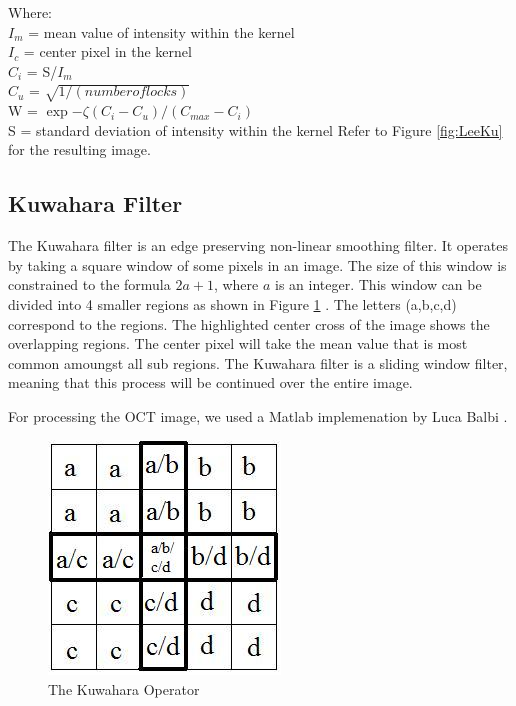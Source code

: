 \documentclass{article}
\begin{document}
Where:
\\
	$I_{m}$ = mean value of intensity within the kernel
	\\
	$I_{c}$ = center pixel in the kernel
	\\
	$C_{i}$ = S/$I_{m}$
	\\
	$C_{u}$ = $\sqrt{1/(number of locks)}$
	\\
	W				= $\exp{-\zeta(C_{i}-C_{u})/(C_{max}-C_{i})}$
	\\
	S       = standard deviation of intensity within the kernel
	\cite{radarlee}
  Refer to Figure \ref{fig:LeeKu} for the resulting image.
\subsection{\label{sec:level2} Kuwahara Filter}

The Kuwahara filter is an edge preserving non-linear smoothing filter. It operates by taking a square window of some pixels in an image. The size of this window is constrained to the formula $2a + 1$, where $a$ is an integer. This window can be divided into 4 smaller regions as shown in Figure \ref{fig:kusquares} \cite{Papari_2007}. The letters (a,b,c,d) correspond to the regions. The highlighted center cross of the image shows the overlapping regions. The center pixel will take the mean value that is most common amoungst all sub regions. The Kuwahara filter is a sliding window filter, meaning that this process will be continued over the entire image.

For processing the OCT image, we used a Matlab implemenation by Luca Balbi \cite{balbi_faster}.
\begin{figure}
  \centering
  \includegraphics[width=0.5\linewidth]{Figures/kusquares}
  \caption{The Kuwahara Operator \cite{kuwahara_operator}}
  \label{fig:kusquares}
\end{figure}
\end{document}
